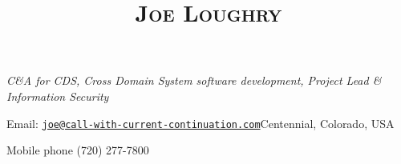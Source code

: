 \documentclass[12pt,letterpaper]{article}
\date{}
\title{\textsc{Joe Loughry}}
\author{}
\begin{document}
\maketitle
\thispagestyle{empty}

\vspace{-32mm}
{\emph{C\&A for CDS, Cross Domain System software development, Project Lead \& Information Security}}


\vspace{4mm}
Email: \href{mailto:joe@call-with-current-continuation.com}{\nolinkurl{joe@call-with-current-continuation.com}}\hfill Centennial, Colorado, USA

\hfill Mobile phone (720) 277-7800 %
\end{document}
